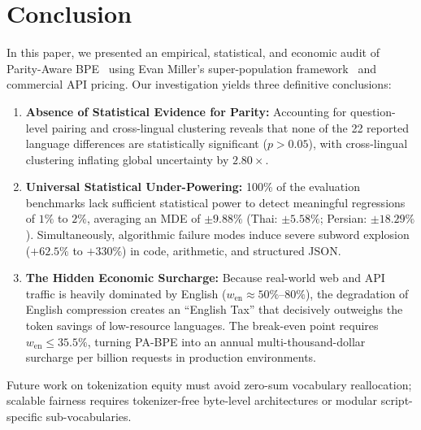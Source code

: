 

\section{Conclusion}
\label{sec:conclusion}

In this paper, we presented an empirical, statistical, and economic audit of Parity-Aware BPE~\cite{foroutan2026parity} using Evan Miller's super-population framework~\cite{miller2024adding} and commercial API pricing. Our investigation yields three definitive conclusions:
\begin{enumerate}
    \item \textbf{Absence of Statistical Evidence for Parity:} Accounting for question-level pairing and cross-lingual clustering reveals that none of the 22 reported language differences are statistically significant ($p > 0.05$), with cross-lingual clustering inflating global uncertainty by $2.80\times$.
    \item \textbf{Universal Statistical Under-Powering:} 100\% of the evaluation benchmarks lack sufficient statistical power to detect meaningful regressions of $1\%$ to $2\%$, averaging an MDE of $\pm 9.88\%$ (Thai: $\pm 5.58\%$; Persian: $\pm 18.29\%$). Simultaneously, algorithmic failure modes induce severe subword explosion ($+62.5\%$ to $+330\%$) in code, arithmetic, and structured JSON.
    \item \textbf{The Hidden Economic Surcharge:} Because real-world web and API traffic is heavily dominated by English ($w_{\mathrm{en}} \approx 50\%$--$80\%$), the degradation of English compression creates an ``English Tax'' that decisively outweighs the token savings of low-resource languages. The break-even point requires $w_{\mathrm{en}} \le 35.5\%$, turning PA-BPE into an annual multi-thousand-dollar surcharge per billion requests in production environments.
\end{enumerate}
Future work on tokenization equity must avoid zero-sum vocabulary reallocation; scalable fairness requires tokenizer-free byte-level architectures or modular script-specific sub-vocabularies.


